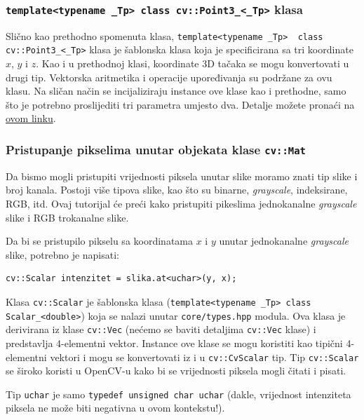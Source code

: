\documentclass[a4paper, 12pt]{article}
\begin{document}
\subsubsection*{\lstinline{template<typename _Tp> class cv::Point3_<_Tp>} klasa}

Slično kao prethodno spomenuta klasa, \lstinline{template<typename _Tp>  class cv::Point3_<_Tp>} klasa je šablonska klasa koja je specificirana sa tri koordinate $x$, $y$ i $z$. Kao i u prethodnoj klasi, koordinate 3D tačaka se mogu konvertovati u drugi tip. Vektorska aritmetika i operacije upoređivanja su podržane za ovu klasu. Na sličan način se incijaliziraju instance ove klase kao i prethodne, samo što je potrebno proslijediti tri parametra umjesto dva. Detalje možete pronaći na \href{https://docs.opencv.org/3.4/df/d6c/classcv_1_1Point3__.html}{ovom linku}.

\subsubsection*{Pristupanje pikselima unutar objekata klase \lstinline{cv::Mat}}

Da bismo mogli pristupiti vrijednosti piksela unutar slike moramo znati tip slike i broj kanala. Postoji više tipova slike, kao što su binarne, \textit{grayscale}, indeksirane, RGB, itd. Ovaj tutorijal će preći kako pristupiti pikeslima jednokanalne \textit{grayscale} slike i RGB trokanalne slike. 

Da bi se pristupilo pikselu sa koordinatama $x$ i $y$ unutar jednokanalne \textit{grayscale} slike, potrebno je napisati:

\begin{lstlisting}
cv::Scalar intenzitet = slika.at<uchar>(y, x);
\end{lstlisting}

Klasa \lstinline{cv::Scalar} je šablonska klasa (\lstinline{template<typename _Tp> class Scalar_<double>}) koja se nalazi unutar \lstinline{core/types.hpp} modula. Ova klasa je derivirana iz klase \lstinline{cv::Vec} (nećemo se baviti detaljima \lstinline{cv::Vec} klase) i predstavlja 4-elementni vektor. Instance ove klase se mogu koristiti kao tipični 4-elementni vektori i mogu se konvertovati iz i u \lstinline{cv::CvScalar} tip. Tip \lstinline{cv::Scalar} se široko koristi u OpenCV-u kako bi se vrijednosti piksela mogli čitati i pisati.

Tip \lstinline{uchar} je samo \lstinline{typedef unsigned char uchar} (dakle, vrijednost intenziteta piksela ne može biti negativna u ovom kontekstu!).
\end{document}
